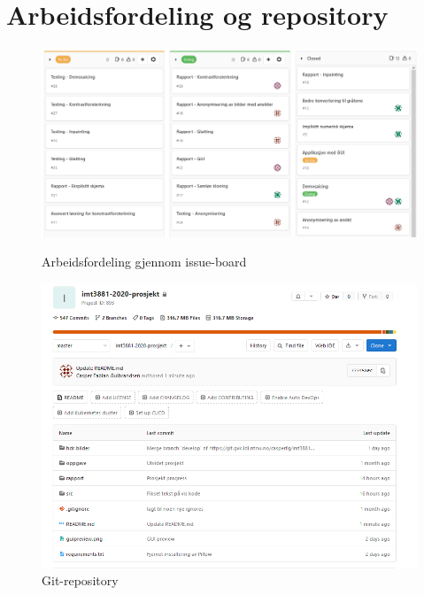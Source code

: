 \section{Arbeidsfordeling og repository}
\begin{figure}[H]
\begin{center}
    \includegraphics[width=1\columnwidth]{bilder/Appendiks/issueboard.png}
    \caption{Arbeidsfordeling gjennom issue-board\label{Fig:issueboard}}
    \includegraphics[width=1\columnwidth]{bilder/Appendiks/Repo-preview.PNG}
    \caption{Git-repository\label{Fig:gitlab}}
\end{center}
\end{figure}


